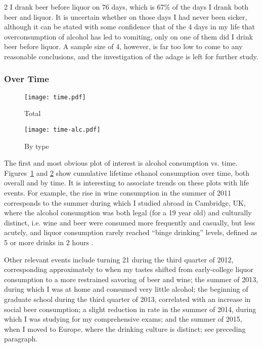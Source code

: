 \documentclass{article}
\newlength{\figsig}
\begin{document}
\begin{multicols}{2}
	I drank beer before liquor on 76 days, which is 67\% of the days I drank both beer and liquor. It is uncertain whether on those days I had never been sicker, although it can be stated with some confidence that of the 4 days in my life that overconsumption of alcohol has led to vomiting, only on one of them did I drink beer before liquor. A sample size of 4, however, is far too low to come to any reasonable conclusions, and the investigation of the adage is left for further study.
	
	\subsubsection*{Over Time}

	\begin{figure*}[htb]
		\centering
		\begin{subfigure}[b]{\figsig}
			\texttt{[image: time.pdf]}
			\caption{Total}
			\label{time-total}
		\end{subfigure}
		\begin{subfigure}[b]{\figsig}
			\texttt{[image: time-alc.pdf]}
			\caption{By type}
			\label{time-alc}
		\end{subfigure}
		\caption{Cumulative lifetime ethanol consumption vs. time.}
	\end{figure*}

	The first and most obvious plot of interest is alcohol consumption vs. time. Figures~\ref{time-total} and \ref{time-alc} show cumulative lifetime ethanol consumption over time, both overall and by time. It is interesting to associate trends on these plots with life events. For example, the rise in wine consumption in the summer of 2011 corresponds to the summer during which I studied abroad in Cambridge, UK, where the alcohol consumption was both legal (for a 19 year old) and culturally distinct, i.e. wine and beer were consumed more frequently and casually, but less acutely, and liquor consumption rarely reached ``binge drinking'' levels, defined as 5 or more drinks in 2 hours \cite{cdc}.

	Other relevant events include turning 21 during the third quarter of 2012, corresponding approximately to when my tastes shifted from early-college liquor consumption to a more restrained savoring of beer and wine; the summer of 2013, during which I was at home and consumed very little alcohol; the beginning of graduate school during the third quarter of 2013, correlated with an increase in social beer consumption; a slight reduction in rate in the summer of 2014, during which I was studying for my comprehensive exams; and the summer of 2015, when I moved to Europe, where the drinking culture is distinct; see preceding paragraph.
	

\end{multicols}
\end{document}
